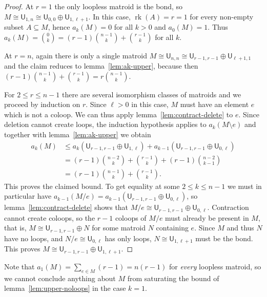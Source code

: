 \documentclass[pagesize,paper=A4,11pt,bibliography=totoc,oneside]{scrartcl}
\DeclareMathOperator{\rk}{rk}
\newcommand{\UM}[2]{\mathsf{U}_{#2,#1}} %
\begin{document}
\begin{proof}
    At $r=1$ the only loopless matroid is the bond, so $M\cong \UM{n}{1}\cong \UM{0}{0}\oplus \UM{\ell+1}{1}$. In this case, $\rk(A)=r=1$ for every non-empty subset $A\subseteq M$, hence $a_k(M)=0$ for all $k>0$ and $a_0(M)=1$. Thus $a_k(M)=\binom{0}{k}=(r-1)\binom{n-1}{k}+\binom{r-1}{k}$ for all $k$.
    
    At $r=n$, again there is only a single matroid $M\cong\UM{n}{n}\cong\UM{r-1}{r-1}\oplus\UM{1}{\ell+1}$ and the claim reduces to lemma~\ref{lem:ak-upper}, because then $(r-1)\binom{n-1}{k}+\binom{r-1}{k}=r\binom{n-1}{k}$.

    For $2\leq r\leq n-1$ there are several isomorphism classes of matroids and we proceed by induction on $r$. Since $\ell>0$ in this case, $M$ must have an element $e$ which is not a coloop. We can thus apply lemma~\ref{lem:contract-delete} to $e$. Since deletion cannot create loops, the induction hypothesis applies to $a_k(M\setminus e)$ and together with lemma~\ref{lem:ak-upper} we obtain
    \begin{align*}
        a_k(M) &\leq a_k(\UM{r-1}{r-1}\oplus\UM{\ell}{1}) + a_{k-1}(\UM{r-1}{r-1}\oplus\UM{\ell}{0})
        \\ &= (r-1)\binom{n-2}{k} + \binom{r-1}{k} + (r-1)\binom{n-2}{k-1}
        \\ &= (r-1)\binom{n-1}{k} + \binom{r-1}{k}.
    \end{align*}
    This proves the claimed bound. To get equality at some $2\leq k\leq n-1$ we must in particular have $a_{k-1}(M/e)=a_{k-1}(\UM{r-1}{r-1}\oplus\UM{\ell}{0})$, so lemma~\ref{lem:contract-delete} shows that $M/e\cong \UM{r-1}{r-1}\oplus\UM{\ell}{0}$. Contraction cannot create coloops, so the $r-1$ coloops of $M/e$ must already be present in $M$, that is, $M\cong\UM{r-1}{r-1}\oplus N$ for some matroid $N$ containing $e$. Since $M$ and thus $N$ have no loops, and $N/e\cong\UM{\ell}{0}$ has only loops, $N\cong\UM{\ell+1}{1}$ must be the bond. This proves $M\cong \UM{r-1}{r-1}\oplus\UM{\ell+1}{1}$.
\end{proof}
Note that $a_1(M)=\sum_{e\in M} (r-1)=n(r-1)$ for \emph{every} loopless matroid, so we cannot conclude anything about $M$ from saturating the bound of lemma~\ref{lem:upper-noloops} in the case $k=1$.
\end{document}
